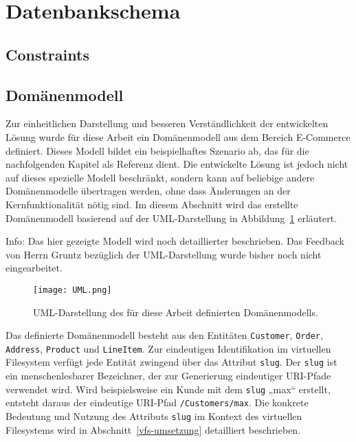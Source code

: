\section{Datenbankschema}
\label{kap:dbschema}


\subsection{Constraints}
\label{ab:con}

\subsection{Domänenmodell}
Zur einheitlichen Darstellung und besseren Verständlichkeit der entwickelten Lösung wurde für diese Arbeit ein Domänenmodell aus dem Bereich E-Commerce definiert. Dieses Modell bildet ein beispielhaftes Szenario ab, das für die nachfolgenden Kapitel als Referenz dient. Die entwickelte Lösung ist jedoch nicht auf dieses spezielle Modell beschränkt, sondern kann auf beliebige andere Domänenmodelle übertragen werden, ohne dass Änderungen an der Kernfunktionalität nötig sind. Im diesem Abschnitt wird das erstellte Domänenmodell basierend auf der UML-Darstellung in Abbildung~\ref{fig:uml_modell} erläutert.

Info:
Das hier gezeigte Modell wird noch detaillierter beschrieben. Das Feedback von Herrn Gruntz bezüglich der UML-Darstellung wurde bisher noch nicht eingearbeitet.

\begin{figure}[H]
  \centering
  \texttt{[image: UML.png]}
  \caption{UML-Darstellung des für diese Arbeit definierten Domänenmodells.}
  \label{fig:uml_modell}
\end{figure}

Das definierte Domänenmodell besteht aus den Entitäten \texttt{Customer}, \texttt{Order}, \texttt{Address}, \texttt{Product} und \texttt{LineItem}. Zur eindeutigen Identifikation im virtuellen Filesystem verfügt jede Entität zwingend über das Attribut \texttt{slug}. Der \texttt{slug} ist ein menschenlesbarer Bezeichner, der zur Generierung eindeutiger URI-Pfade verwendet wird. Wird beispielsweise ein Kunde mit dem \texttt{slug} „max“ erstellt, entsteht daraus der eindeutige URI-Pfad \texttt{/Customers/max}. Die konkrete Bedeutung und Nutzung des Attributs \texttt{slug} im Kontext des virtuellen Filesystems wird in Abschnitt~\ref{vfs-umsetzung} detailliert beschrieben.